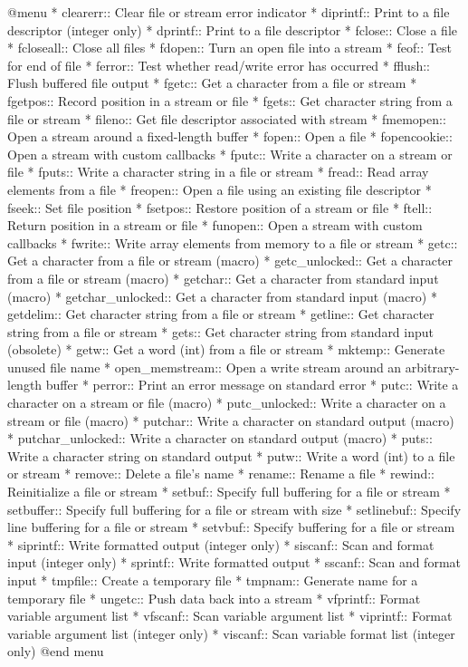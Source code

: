 @menu
* clearerr::    Clear file or stream error indicator
* diprintf::    Print to a file descriptor (integer only)
* dprintf::     Print to a file descriptor
* fclose::      Close a file
* fcloseall::   Close all files
* fdopen::      Turn an open file into a stream
* feof::        Test for end of file
* ferror::      Test whether read/write error has occurred
* fflush::      Flush buffered file output
* fgetc::       Get a character from a file or stream
* fgetpos::     Record position in a stream or file
* fgets::       Get character string from a file or stream
* fileno::      Get file descriptor associated with stream
* fmemopen::    Open a stream around a fixed-length buffer
* fopen::       Open a file
* fopencookie:: Open a stream with custom callbacks
* fputc::       Write a character on a stream or file
* fputs::       Write a character string in a file or stream
* fread::       Read array elements from a file
* freopen::     Open a file using an existing file descriptor
* fseek::       Set file position
* fsetpos::     Restore position of a stream or file
* ftell::       Return position in a stream or file
* funopen::     Open a stream with custom callbacks
* fwrite::      Write array elements from memory to a file or stream
* getc::        Get a character from a file or stream (macro)
* getc_unlocked::	Get a character from a file or stream (macro)
* getchar::     Get a character from standard input (macro)
* getchar_unlocked::	Get a character from standard input (macro)
* getdelim::    Get character string from a file or stream
* getline::     Get character string from a file or stream
* gets::        Get character string from standard input (obsolete)
* getw::        Get a word (int) from a file or stream
* mktemp::      Generate unused file name
* open_memstream::	Open a write stream around an arbitrary-length buffer
* perror::      Print an error message on standard error
* putc::        Write a character on a stream or file (macro)
* putc_unlocked::	Write a character on a stream or file (macro)
* putchar::     Write a character on standard output (macro)
* putchar_unlocked::	Write a character on standard output (macro)
* puts::        Write a character string on standard output
* putw::        Write a word (int) to a file or stream
* remove::      Delete a file's name
* rename::      Rename a file
* rewind::      Reinitialize a file or stream
* setbuf::      Specify full buffering for a file or stream
* setbuffer::   Specify full buffering for a file or stream with size
* setlinebuf::  Specify line buffering for a file or stream
* setvbuf::     Specify buffering for a file or stream
* siprintf::    Write formatted output (integer only)
* siscanf::     Scan and format input (integer only)
* sprintf::     Write formatted output
* sscanf::      Scan and format input
* tmpfile::     Create a temporary file
* tmpnam::      Generate name for a temporary file
* ungetc::      Push data back into a stream
* vfprintf::    Format variable argument list
* vfscanf::     Scan variable argument list
* viprintf::    Format variable argument list (integer only)
* viscanf::     Scan variable format list (integer only)
@end menu

